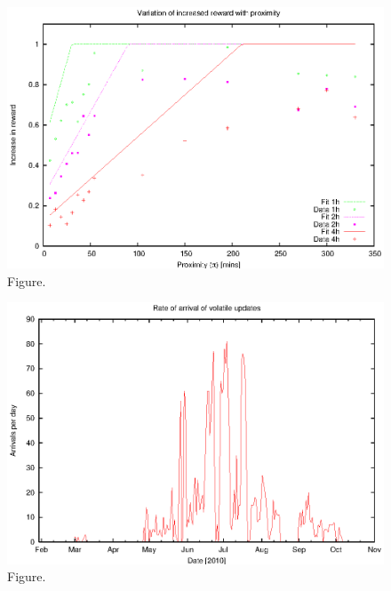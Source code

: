 \documentclass[12pt,a4paper]{article}
\begin{document}
\begin{figure}[htbp]
 \begin{center}
  \includegraphics[scale=1.0, angle=0]{figures/volpi_hi.eps}
 \end{center}
  \caption[Figure.]
{Figure.}
\end{figure}
\clearpage
\begin{figure}[htbp]
 \begin{center}
  \includegraphics[scale=1.0, angle=0]{figures/volrate.eps}
 \end{center}
  \caption[Figure.]
{Figure.}
\end{figure}
\clearpage
\end{document}
